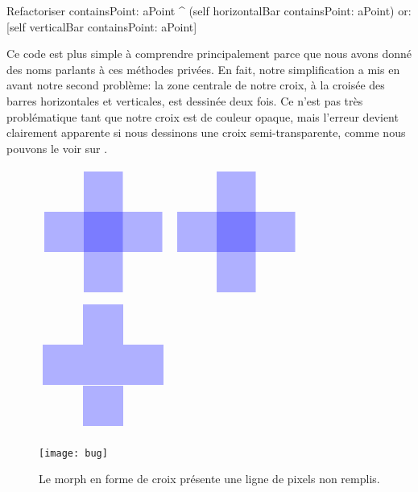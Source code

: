 \documentclass[a4paper,10pt,twoside]{book}
\begin{document}
\begin{method}{Refactoriser }
containsPoint: aPoint
	^ (self horizontalBar containsPoint: aPoint)
		or: [self verticalBar containsPoint: aPoint]
\end{method}

Ce code est plus simple \`a comprendre principalement parce que nous
avons donné des noms parlants \`a ces méthodes privées. En fait,
notre simplification a mis en avant notre second problème: 
la zone centrale de notre croix, \`a la croisée des barres
horizontales et verticales, est dessinée deux fois. Ce n'est pas
très problématique tant que notre croix est de couleur opaque,
mais l'erreur devient clairement apparente si nous dessinons une croix
semi-transparente, comme nous pouvons le voir sur .

\begin{figure}[t]
\begin{minipage}{0.48\textwidth}
	\ifluluelse
		{\centerline{\includegraphics[scale=0.6]{overdrawBug}}}
		{\centerline{\includegraphics{overdrawBug}}}
	\caption{Le centre de la croix est rempli deux fois avec la
      couleur.	\label{fig:overdrawBug}}
\end{minipage}
\hfill
\begin{minipage}{0.48\textwidth}
	\ifluluelse
		{\centerline{\includegraphics[scale=0.6]{hairlineBug}}}
		{\centerline{\texttt{[image: bug]}}}
	\caption{Le morph en forme de croix présente une ligne de pixels
      non remplis.	\label{fig:bug}}
\end{minipage}
\end{figure}
\end{document}
